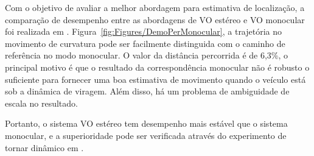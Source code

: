 Com o objetivo de avaliar a melhor abordagem para estimativa de localização, a comparação de desempenho entre as abordagens de VO estéreo e VO monocular foi realizada em \cite{chen2015performance}. Figura~\ref{fig:Figures/DemoPerMonocular}, a trajetória no movimento de curvatura pode ser facilmente distinguida com o caminho de referência no modo monocular. O valor da distância percorrida é de 6,3\%, o principal motivo é que o resultado da correspondência monocular não é robusto o suficiente para fornecer uma boa estimativa de movimento quando o veículo está sob a dinâmica de viragem. Além disso, há um problema de ambiguidade de escala no resultado.

Portanto, o sistema VO estéreo tem desempenho mais estável que o sistema monocular, e a superioridade pode ser verificada através do experimento de tornar dinâmico em \cite{chen2015performance}.

